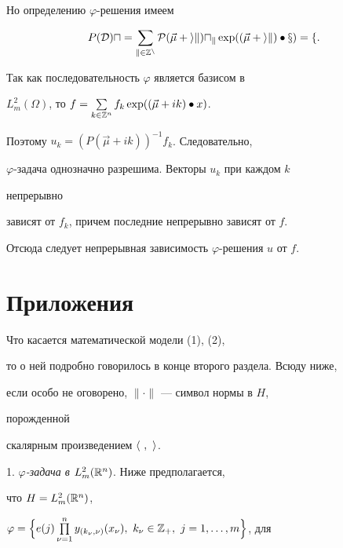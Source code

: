  


\begin{pf} 


Но определению $\varphi$-решения имеем 


$$ 


P(\cal D)u=\sum_{k\in\Bbb Z^n}P(\Vec\mu+ik)u_k\exp 


((\Vec\mu+ik)\bullet x)=f. 


$$ 


Так как последовательность $\varphi$ является базисом в 


$L^2_m(\Omega)$, то $f=\sum\limits_{k\in\Bbb 


Z^n}f_k\exp((\Vec\mu+ik)\bullet x)$. 


Поэтому $u_k=(P(\Vec\mu+ik))^{-1}f_k$. Следовательно, 


$\varphi$-задача однозначно разрешима. Векторы $u_k$ при каждом $k$ 


непрерывно 


зависят от $f_k$, причем последние непрерывно зависят от $f$. 


Отсюда следует непрерывная зависимость $\varphi$-решения $u$ от $f$. 


\end{pf} 


 


\section{Приложения} 


 


Что касается математической модели (1), (2), 


то о ней подробно говорилось в конце второго раздела. Всюду ниже,  


если особо не оговорено, $\|\cdot\|$ --- символ нормы в $H$, 


порожденной  


скалярным произведением $\la\ ,\ \ra$. 


 


1. {\it $\varphi$-задача в $L^2_m(\Bbb R^n)$}. Ниже предполагается, 


что $H=L^2_m(\Bbb R^n)$, 


$\varphi=\Big\{e(j)\prod\limits^n_{\nu=1}y_{(k_\nu,\nu)}(x_\nu), 


\ k_\nu\in\Bbb Z_+,\ j=1,\dotsc,m\Big\}$, для 


